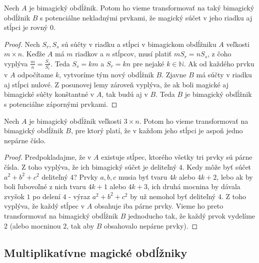 \begin{theorem} 
\label{rectangle0}
Nech $A$ je bimagický obdĺžnik. Potom ho vieme transformovať na taký bimagický obdĺžnik $B$ s potenciálne nekladnými prvkami, že magický súčet v jeho riadku aj stĺpci je rovný $0$.
\end{theorem}

\begin{proof} Nech $S_r, S_s$ sú súčty v riadku a stĺpci v bimagickom obdĺžniku $A$ veľkosti $m \times n$. Keďže $A$ má $m$ riadkov a $n$ stĺpcov, musí platiť $m S_r = n S_s$, z čoho vyplýva $\frac{m}{n} = \frac{S_s}{S_r}$. Teda $S_s = km$ a $S_r = kn$ pre nejaké $k \in \mathbb{N}$. Ak od každého prvku v $A$ odpočítame $k$, vytvoríme tým nový obdĺžnik $B$. Zjavne $B$ má súčty v riadku aj stĺpci nulové. Z posunovej lemy zároveň vyplýva, že ak boli magické aj bimagické súčty konštantné v $A$, tak budú aj v $B$. Teda $B$ je bimagický obdĺžnik s potenciálne zápornými prvkami.
\end{proof}

\begin{theorem}
\label{rectangleodd}
Nech $A$ je bimagický obdĺžnik veľkosti $3 \times n$. Potom ho vieme transformovať na bimagický obdĺžnik $B$, pre ktorý platí, že v každom jeho stĺpci je aspoň jedno nepárne číslo.
\end{theorem}

\begin{proof} Predpokladajme, že v $A$ existuje stĺpec, ktorého všetky tri prvky sú párne čísla. Z toho vyplýva, že ich bimagický súčet je deliteľný $4$. Kedy môže byť súčet $a^2 + b^2 + c^2$ deliteľný $4$? Prvky $a,b,c$ musia byť tvaru $4k$ alebo $4k+2$, lebo ak by boli ľubovoľné z nich tvaru $4k+1$ alebo $4k+3$, ich druhá mocnina by dávala zvyšok $1$ po delení $4$ - výraz $a^2 + b^2 + c^2$ by už nemohol byť deliteľný $4$. Z toho vyplýva, že každý stĺpec v $A$ obsahuje iba párne prvky. Vieme ho preto transformovať na bimagický obdĺžnik $B$ jednoducho tak, že každý prvok vydelíme $2$ (alebo mocninou $2$, tak aby $B$ obsahovalo nepárne prvky).
\end{proof}



\subsection{Multiplikatívne magické obdĺžniky}

